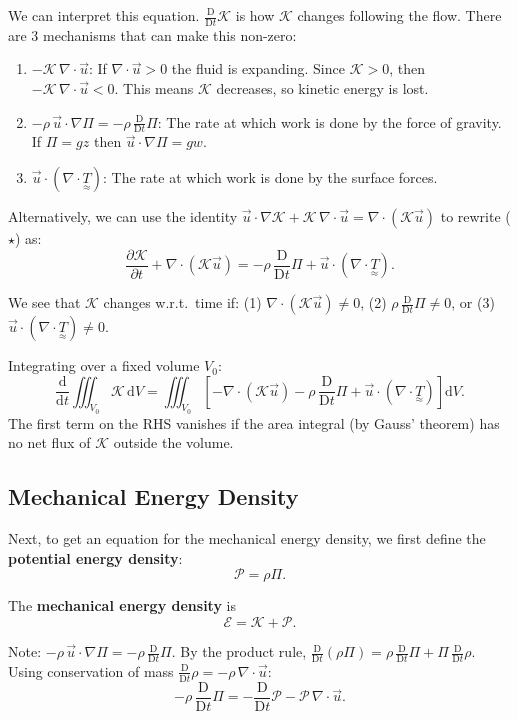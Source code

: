 \documentclass[11pt,a4paper]{article}
\newcommand{\D}{\mathrm{D}}
\newcommand{\Dt}{\frac{\D}{\D t}}
\newcommand{\pdt}[1]{\frac{\partial #1}{\partial t}}
\newcommand{\uv}{\vec{u}}
\newcommand{\tens}[1]{\underset{\approx}{#1}}
\begin{document}
We can interpret this equation. $\Dt\mathcal{K}$ is how $\mathcal{K}$ changes following the flow. There are 3 mechanisms that can make this non-zero:
\begin{enumerate}[label=(\roman*)]
    \item $-\mathcal{K}\,\nabla\cdot\uv$: If $\nabla\cdot\uv > 0$ the fluid is expanding. Since $\mathcal{K} > 0$, then $-\mathcal{K}\,\nabla\cdot\uv < 0$. This means $\mathcal{K}$ decreases, so kinetic energy is lost.
    \item $-\rho\,\uv\cdot\nabla\Pi = -\rho\,\Dt\Pi$: The rate at which work is done by the force of gravity. If $\Pi = gz$ then $\uv\cdot\nabla\Pi = gw$.
    \item $\uv\cdot(\nabla\cdot\tens{T})$: The rate at which work is done by the surface forces.
\end{enumerate}

Alternatively, we can use the identity $\uv\cdot\nabla\mathcal{K} + \mathcal{K}\,\nabla\cdot\uv = \nabla\cdot(\mathcal{K}\uv)$ to rewrite ($\star$) as:
\[
    \boxed{\pdt{\mathcal{K}} + \nabla\cdot(\mathcal{K}\uv) = -\rho\,\Dt\Pi + \uv\cdot(\nabla\cdot\tens{T}).}
    \tag{$\star\star$}
\]

We see that $\mathcal{K}$ changes w.r.t.\ time if: (1) $\nabla\cdot(\mathcal{K}\uv) \neq 0$, (2) $\rho\,\Dt\Pi \neq 0$, or (3) $\uv\cdot(\nabla\cdot\tens{T}) \neq 0$.

Integrating over a fixed volume $V_0$:
\[
    \frac{\mathrm{d}}{\mathrm{d}t}\iiint_{V_0} \mathcal{K}\,\mathrm{d}V
    = \iiint_{V_0}\left[-\nabla\cdot(\mathcal{K}\uv) - \rho\,\Dt\Pi + \uv\cdot(\nabla\cdot\tens{T})\right]\mathrm{d}V.
\]
The first term on the RHS vanishes if the area integral (by Gauss' theorem) has no net flux of $\mathcal{K}$ outside the volume.

\subsection{Mechanical Energy Density}

Next, to get an equation for the mechanical energy density, we first define the \textbf{potential energy density}:
\[
    \boxed{\mathcal{P} = \rho\Pi.}
\]

The \textbf{mechanical energy density} is
\[
    \boxed{\mathcal{E} = \mathcal{K} + \mathcal{P}.}
\]

Note: $-\rho\,\uv\cdot\nabla\Pi = -\rho\,\Dt\Pi$. By the product rule, $\Dt(\rho\Pi) = \rho\,\Dt\Pi + \Pi\,\Dt\rho$. Using conservation of mass $\Dt\rho = -\rho\,\nabla\cdot\uv$:
\[
    -\rho\,\Dt\Pi = -\Dt\mathcal{P} - \mathcal{P}\,\nabla\cdot\uv.
\]
\end{document}
